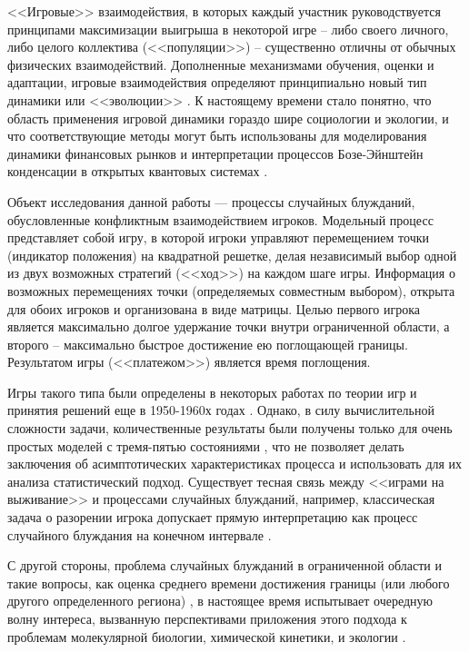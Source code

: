 
{\actuality} <<Игровые>> взаимодействия, в которых каждый участник руководствуется принципами максимизации выигрыша в некоторой игре -- 
либо своего личного, либо целого коллектива (<<популяции>>) – существенно отличны от обычных физических взаимодействий. 
Дополненные механизмами обучения, оценки и адаптации, игровые взаимодействия определяют принципиально новый тип динамики или <<эволюции>> \cite{nowak_evolutionary_2006}. 
К настоящему времени стало понятно, что область применения игровой динамики гораздо шире социологии и экологии, и что соответствующие 
методы могут быть использованы для моделирования динамики финансовых рынков \cite{li_evolutionary_2013, friedman_towards_2001} 
и интерпретации процессов Бозе-Эйнштейн конденсации в открытых квантовых системах \cite{knebel_evolutionary_2015}. 

Объект исследования данной работы — процессы случайных блужданий, обусловленные конфликтным взаимодействием игроков. 
Модельный процесс представляет собой игру, в которой игроки управляют перемещением точки (индикатор положения) на квадратной решетке, 
делая независимый выбор одной из двух возможных стратегий (<<ход>>) на каждом шаге игры. Информация о возможных перемещениях точки 
(определяемых совместным выбором), открыта для обоих игроков и организована в виде матрицы. Целью первого игрока является максимально 
долгое удержание точки внутри ограниченной области, а второго -- максимально быстрое достижение ею поглощающей границы. 
Результатом игры (<<платежом>>) является время поглощения. 

Игры такого типа были определены в некоторых работах по теории игр и принятия решений еще в 1950-1960х годах \cite{j_w_milnor_games_1955, romanovsky_1961}. 
Однако, в силу вычислительной сложности задачи, количественные результаты были получены только для очень простых моделей 
с тремя-пятью состояниями \cite{raiffa_decision_1993}, что не позволяет делать заключения об асимптотических характеристиках процесса и использовать 
для их анализа статистический подход. Существует тесная связь между <<играми на выживание>> и процессами случайных блужданий, 
например, классическая задача о разорении игрока допускает прямую интерпретацию как процесс случайного блуждания на конечном интервале \cite{raiffa_decision_1993}. 

С другой стороны, проблема случайных блужданий в ограниченной области и такие вопросы, как оценка среднего времени достижения границы 
(или любого другого определенного региона) \cite{redner_guide_2001}, в настоящее время испытывает очередную волну интереса, вызванную перспективами 
приложения этого подхода к проблемам молекулярной биологии, химической кинетики, и экологии \cite{grebenkov_universal_2016, grebenkov_towards_2018}. 

